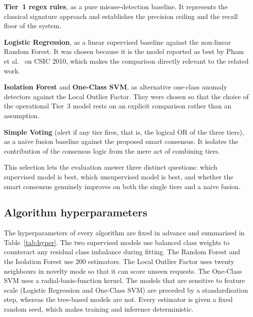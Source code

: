 \documentclass[12pt,a4paper]{report}
\begin{document}
\begin{romanlist}
  \item \textbf{Tier~1 regex rules}, as a pure misuse-detection baseline.
        It represents the classical signature approach and establishes the
        precision ceiling and the recall floor of the system.
  \item \textbf{Logistic Regression}, as a linear supervised baseline against
        the non-linear Random Forest. It was chosen because it is the model
        reported as best by Pham et al.~\cite{pham2016} on CSIC 2010, which
        makes the comparison directly relevant to the related work.
  \item \textbf{Isolation Forest} and \textbf{One-Class SVM}, as alternative
        one-class anomaly detectors against the Local Outlier Factor. They
        were chosen so that the choice of the operational Tier~3 model rests
        on an explicit comparison rather than an assumption.
  \item \textbf{Simple Voting} (alert if any tier fires, that is, the logical
        OR of the three tiers), as a naive fusion baseline against the
        proposed smart consensus. It isolates the contribution of the
        consensus logic from the mere act of combining tiers.
\end{romanlist}

This selection lets the evaluation answer three distinct questions: which
supervised model is best, which unsupervised model is best, and whether the
smart consensus genuinely improves on both the single tiers and a naive
fusion.

\subsection{Algorithm hyperparameters}
\label{sec:sim-hyper}

The hyperparameters of every algorithm are fixed in advance and summarised in
Table~\ref{tab:hyper}. The two supervised models use balanced class weights
to counteract any residual class imbalance during fitting. The Random Forest
and the Isolation Forest use $200$ estimators. The Local Outlier Factor uses
twenty neighbours in novelty mode so that it can score unseen requests. The
One-Class SVM uses a radial-basis-function kernel. The models that are
sensitive to feature scale (Logistic Regression and One-Class SVM) are
preceded by a standardisation step, whereas the tree-based models are not.
Every estimator is given a fixed random seed, which makes training and
inference deterministic.
\end{document}
